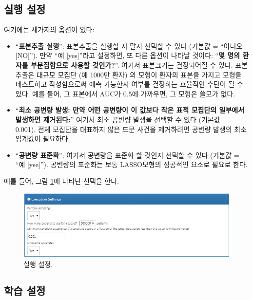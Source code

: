 \documentclass[11pt]{book}
\providecommand{\tightlist}{%
  \setlength{\itemsep}{0pt}\setlength{\parskip}{0pt}}
\theoremstyle{definition}
\theoremstyle{definition}
\theoremstyle{definition}
\theoremstyle{remark}
\begin{document}
\subsection{실행 설정}\label{-}

여기에는 세가지의 옵션이 있다:

\begin{itemize}
\tightlist
\item
  ``\textbf{표본추출 실행}'': 표본추출을 실행할 지 말지 선택할 수 있다
  (기본값 = ``아니오 {[}NO{]}''). 만약 ``예 {[}yes{]}''라고 설정하면, 또
  다른 옵션이 나타날 것이다: ``\textbf{몇 명의 환자를 부분집합으로
  사용할 것인가?}''. 여기서 표본크기는 결정되어질 수 있다. 표본추출은
  대규모 모집단 (예 1000만 환자) 의 모형이 환자의 표본을 가지고 모형을
  테스트하고 작성함으로써 예측 가능한지 여부를 결정하는 효율적인 수단이
  될 수 있다. 예를 들어, 그 표본에서 AUC가 0.5에 가까우면, 그 모형은
  쓸모가 없다.
\item
  ``\textbf{최소 공변량 발생: 만약 어떤 공변량이 이 값보다 작은 표적
  모집단의 일부에서 발생하면 제거된다:}'' 여기서 최소 공변량 발생을
  선택할 수 있다 (기본값 = 0.001). 전체 모집단을 대표하지 않은 드문
  사건을 제거하려면 공변량 발생의 최소 임계값이 필요하다.
\item
  ``\textbf{공변량 표준화}'': 여기서 공변량을 표준화 할 것인지 선택할 수
  있다 (기본값 = ``예 {[}yse{]}''). 공변량의 표준화는 보통 LASSO모형의
  성공적인 요소로 필요로 한다.
\end{itemize}

예를 들어, 그림 \ref{fig:executionSettings}에 나타난 선택을 한다.

\begin{figure}

{\centering \includegraphics[width=1\linewidth]{images/PatientLevelPrediction/executionSettings} 

}

\caption{실행 설정.}\label{fig:executionSettings}
\end{figure}

\subsection{학습 설정}\label{-}
\end{document}
